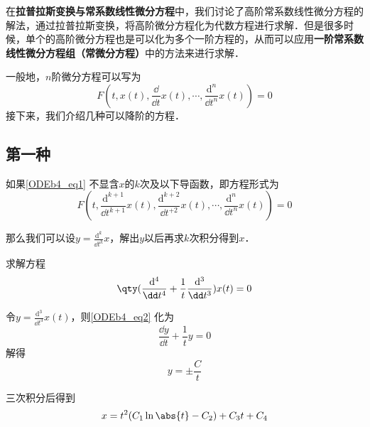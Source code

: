 

在\textbf{拉普拉斯变换与常系数线性微分方程}中，我们讨论了高阶常系数线性微分方程的解法，通过拉普拉斯变换，将高阶微分方程化为代数方程进行求解．但是很多时候，单个的高阶微分方程也是可以化为多个一阶方程的，从而可以应用\textbf{一阶常系数线性微分方程组（常微分方程）}中的方法来进行求解．

一般地，$n$阶微分方程可以写为
\begin{equation}\label{ODEb4_eq1}
F(t, x(t), \frac{\dd}{\dd t}x(t), \cdots, \frac{\mathrm{d}^n}{\dd t^n}x(t))=0
\end{equation}
接下来，我们介绍几种可以降阶的方程．

\subsection{第一种}

如果\autoref{ODEb4_eq1} 不显含$x$的$k$次及以下导函数，即方程形式为
\begin{equation}
F(t, \frac{\mathrm{d}^{k+1}}{\dd t^{k+1}}x(t), \frac{\mathrm{d}^{k+2}}{\dd t^{+2}}x(t), \cdots, \frac{\mathrm{d}^n}{\dd t^n}x(t))=0
\end{equation}

那么我们可以设$y=\frac{\mathrm{d}^k}{\dd t^k}x$，解出$y$以后再求$k$次积分得到$x$．


\begin{example}{}
求解方程
\begin{equation}\label{ODEb4_eq2}
\qty(
    \frac{\mathrm{d}^4}{\dd t^4}+\frac{1}{t}\frac{\mathrm{d}^3}{\dd t^3}
    )
    x(t)=0
\end{equation}

令$y=\frac{\mathrm{d}^3}{\dd t^3}x(t)$，则\autoref{ODEb4_eq2} 化为
\begin{equation}
\frac{\dd y}{\dd t}+\frac{1}{t}y=0
\end{equation}
解得
\begin{equation}
y=\pm\frac{C}{t}
\end{equation}

三次积分后得到
\begin{equation}
x=t^2(C_1\ln\abs{t}-C_2)+C_3t+C_4
\end{equation}



\end{example}


